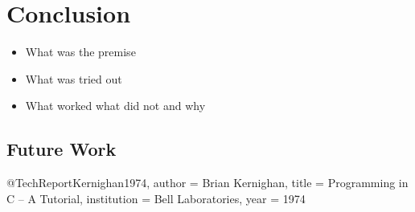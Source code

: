 \documentclass[english, version-2022-01]{uzl-thesis}
\begin{document}

\chapter{Conclusion}

\begin{itemize}
	\item What was the premise
	\item What was tried out
	\item What worked what did not and why
\end{itemize}

\section{Future Work}

\begin{bibtex-entries}
@TechReport{Kernighan1974,
	author = {Brian Kernighan},
	title = {Programming in C – A Tutorial},
	institution = {Bell Laboratories},
	year = {1974}
}
\end{bibtex-entries}
\end{document}
